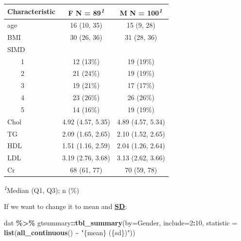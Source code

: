 \documentclass[
]{book}
\newenvironment{Shaded}{\begin{snugshade}}{\end{snugshade}}
\newcommand{\AttributeTok}[1]{\textcolor[rgb]{0.13,0.29,0.53}{#1}}
\newcommand{\DecValTok}[1]{\textcolor[rgb]{0.00,0.00,0.81}{#1}}
\newcommand{\FunctionTok}[1]{\textcolor[rgb]{0.13,0.29,0.53}{\textbf{#1}}}
\newcommand{\NormalTok}[1]{#1}
\newcommand{\SpecialCharTok}[1]{\textcolor[rgb]{0.81,0.36,0.00}{\textbf{#1}}}
\newcommand{\StringTok}[1]{\textcolor[rgb]{0.31,0.60,0.02}{#1}}
\begin{document}
\begin{table}[t]
\fontsize{12.0pt}{14.0pt}\selectfont
\begin{tabular*}{\linewidth}{@{\extracolsep{\fill}}lcc}
\toprule
\textbf{Characteristic} & \textbf{F}  N = 89\textsuperscript{\textit{1}} & \textbf{M}  N = 100\textsuperscript{\textit{1}} \\ 
\midrule\addlinespace[2.5pt]
age & 16 (10, 35) & 15 (9, 28) \\ 
BMI & 30 (26, 36) & 31 (28, 36) \\ 
SIMD &  &  \\ 
    1 & 12 (13\%) & 19 (19\%) \\ 
    2 & 21 (24\%) & 19 (19\%) \\ 
    3 & 19 (21\%) & 17 (17\%) \\ 
    4 & 23 (26\%) & 26 (26\%) \\ 
    5 & 14 (16\%) & 19 (19\%) \\ 
Chol & 4.92 (4.57, 5.35) & 4.89 (4.57, 5.34) \\ 
TG & 2.09 (1.65, 2.65) & 2.10 (1.52, 2.65) \\ 
HDL & 1.51 (1.16, 2.59) & 2.04 (1.26, 2.64) \\ 
LDL & 3.19 (2.76, 3.68) & 3.13 (2.62, 3.66) \\ 
Cr & 68 (61, 77) & 70 (59, 78) \\ 
\bottomrule
\end{tabular*}
\begin{minipage}{\linewidth}
\vspace{.05em}
\textsuperscript{\textit{1}}Median (Q1, Q3); n (\%)\\
\end{minipage}
\end{table}

If we want to change it to mean and \textbf{\hyperref[acronyms_SD]{SD}}:

\begin{Shaded}
\begin{Highlighting}[]
\NormalTok{dat }\SpecialCharTok{\%\textgreater{}\%}
\NormalTok{  gtsummary}\SpecialCharTok{::}\FunctionTok{tbl\_summary}\NormalTok{(}\AttributeTok{by=}\NormalTok{Gender, }\AttributeTok{include=}\DecValTok{2}\SpecialCharTok{:}\DecValTok{10}\NormalTok{, }
              \AttributeTok{statistic =} \FunctionTok{list}\NormalTok{(}\FunctionTok{all\_continuous}\NormalTok{() }\SpecialCharTok{\textasciitilde{}} \StringTok{"\{mean\} (\{sd\})"}\NormalTok{))}
\end{Highlighting}
\end{Shaded}
\end{document}
